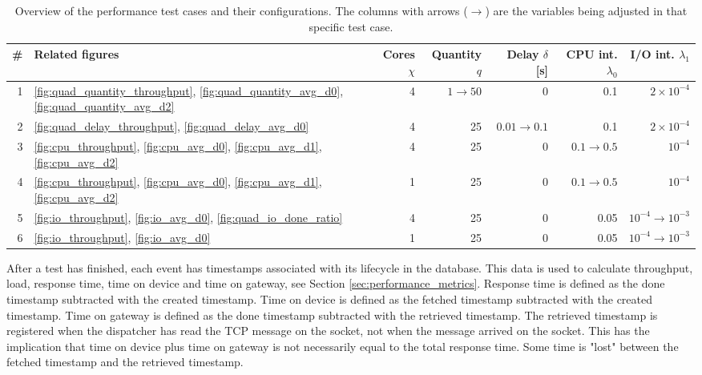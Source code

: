 \bgroup
\def\arraystretch{1.2}
\begin{table}[h!]

    \caption[Overview of the performance test cases.]{Overview of the
    performance test cases and their configurations.  The columns with arrows
    ($\rightarrow$) are the variables being adjusted in that specific test
    case.}

    \label{tab:test_overview}
\begin{center}
\begin{tabular}{|r|l|r|r|r|r|r|}
    \hline
    \# & Related figures & Cores $\chi$ & Quantity $q$ & Delay $\delta$ [s] & CPU int. $\lambda_0$ & I/O int. $\lambda_1$ \\
    \hline
    1 & \ref{fig:quad_quantity_throughput}, \ref{fig:quad_quantity_avg_d0},
    \ref{fig:quad_quantity_avg_d2} & 4 & $1 \rightarrow 50$ & 0 & 0.1 & $2
    \times 10^{-4}$ \\
    \hline
    2 & \ref{fig:quad_delay_throughput}, \ref{fig:quad_delay_avg_d0} & 4 & 25 &
    $0.01 \rightarrow 0.1$ & 0.1 & $2 \times 10^{-4}$ \\
    \hline
    3 & \ref{fig:cpu_throughput}, \ref{fig:cpu_avg_d0}, \ref{fig:cpu_avg_d1},
    \ref{fig:cpu_avg_d2} & 4 & 25 & 0 & $0.1 \rightarrow 0.5$ & $10^{-4}$ \\
    \hline
    4 & \ref{fig:cpu_throughput}, \ref{fig:cpu_avg_d0}, \ref{fig:cpu_avg_d1},
    \ref{fig:cpu_avg_d2} & 1 & 25 & 0 & $0.1 \rightarrow 0.5$ & $10^{-4}$ \\
    \hline
    5 & \ref{fig:io_throughput}, \ref{fig:io_avg_d0},
    \ref{fig:quad_io_done_ratio} & 4 & 25 & 0 & 0.05 & $10^{-4} \rightarrow 10^{-3}$ \\
    \hline
    6 & \ref{fig:io_throughput}, \ref{fig:io_avg_d0} & 1 & 25 & 0 & 0.05 & $10^{-4} \rightarrow 10^{-3}$ \\
    \hline
\end{tabular}
\end{center}
\end{table}

After a test has finished, each event has timestamps associated with its
lifecycle in the database. This data is used to calculate throughput, load,
response time, time on device and time on gateway, see Section
\ref{sec:performance_metrics}. Response time is defined as the done timestamp
subtracted with the created timestamp. Time on device is defined as the fetched
timestamp subtracted with the created timestamp. Time on gateway is defined as
the done timestamp subtracted with the retrieved timestamp. The retrieved
timestamp is registered when the dispatcher has read the TCP message on the
socket, not when the message arrived on the socket. This has the implication
that time on device plus time on gateway is not necessarily equal to the total
response time. Some time is "lost" between the fetched timestamp and the
retrieved timestamp.

